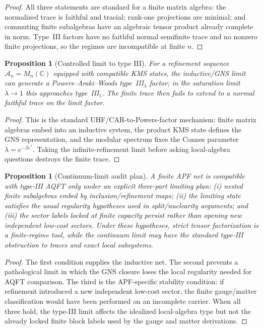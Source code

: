 \documentclass[11pt]{article}
\newtheorem{proposition}[theorem]{Proposition}
\theoremstyle{definition}
\begin{document}
\begin{proof}
All three statements are standard for a finite matrix algebra: the
normalized trace is faithful and tracial; rank-one projections are minimal;
and commuting finite subalgebras have an algebraic tensor product already
complete in norm.  Type~III factors have no faithful normal semifinite
trace and no nonzero finite projections, so the regimes are incompatible at
finite $n$.
\end{proof}

\begin{proposition}[Controlled limit to type III]\label{prop:typeIII_limit}
For a refinement sequence $\mathcal A_n=M_n(\mathbb C)$ equipped with
compatible KMS states, the inductive/GNS limit can generate a
Powers--Araki--Woods type~III$_\lambda$ factor; in the saturation limit
$\lambda\to1$ this approaches type~III$_1$.  The finite trace then fails to
extend to a normal faithful trace on the limit factor.
\end{proposition}

\begin{proof}
This is the standard UHF/CAR-to-Powers-factor mechanism: finite matrix
algebras embed into an inductive system, the product KMS state defines the
GNS representation, and the modular spectrum fixes the Connes parameter
$\lambda=e^{-\beta\varepsilon^*}$.  Taking the infinite-refinement limit
before asking local-algebra questions destroys the finite trace.
\end{proof}


\begin{proposition}[Continuum-limit audit plan]
\label{prop:continuum_plan}
A finite APF net is compatible with type-III AQFT only under an explicit
three-part limiting plan: (i) nested finite subalgebras embed by
inclusion/refinement maps; (ii) the limiting state satisfies the usual
regularity hypotheses used in split/nuclearity arguments; and (iii) the
sector labels locked at finite capacity persist rather than opening new
independent low-cost sectors.  Under these hypotheses, strict tensor
factorization is a finite-regime tool, while the continuum limit may have
the standard type-III obstruction to traces and exact local subsystems.
\end{proposition}

\begin{proof}
The first condition supplies the inductive net.  The second prevents a
pathological limit in which the GNS closure loses the local regularity
needed for AQFT comparison.  The third is the APF-specific stability
condition: if refinement introduced a new independent low-cost sector, the
finite gauge/matter classification would have been performed on an
incomplete carrier.  When all three hold, the type-III limit affects the
idealized local-algebra type but not the already locked finite block labels
used by the gauge and matter derivations.
\end{proof}
\end{document}
